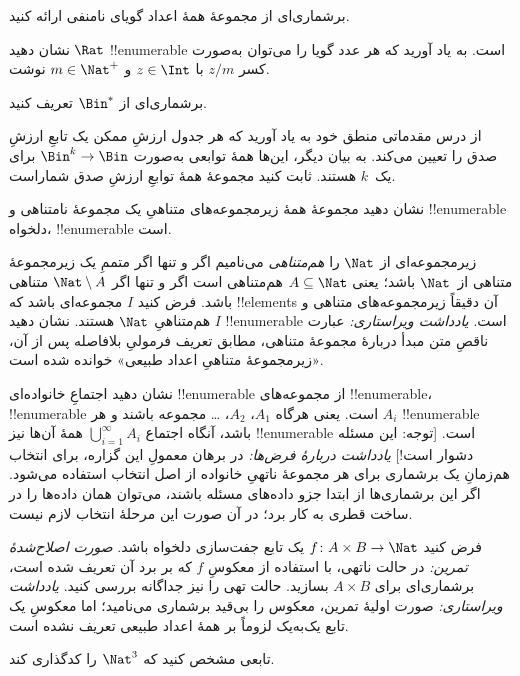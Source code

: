 \documentclass[../../../include/open-logic-section]{subfiles}
\begin{document}
\begin{prob}
برشماری‌ای از مجموعهٔ همهٔ اعداد گویای نامنفی ارائه کنید.
\end{prob}

\begin{prob}
نشان دهید $\Rat$ !!{enumerable} است. به یاد آورید که هر عدد گویا را
می‌توان به‌صورت کسر $z/m$ با $z \in \Int$ و $m \in \Nat^+$ نوشت.
\end{prob}

\begin{prob}
برشماری‌ای از $\Bin^*$ تعریف کنید.
\end{prob}

\begin{prob}
از درس مقدماتی منطق خود به یاد آورید که هر جدول ارزشِ ممکن یک تابعِ ارزشِ صدق
را تعیین می‌کند. به بیان دیگر، این‌ها همهٔ توابعی به‌صورت
$\Bin^k \to \Bin$ برای یک~$k$ هستند. ثابت کنید مجموعهٔ همهٔ توابعِ ارزشِ صدق
شماراست.
\end{prob}

\begin{prob}
نشان دهید مجموعهٔ همهٔ زیرمجموعه‌های متناهیِ یک مجموعهٔ نامتناهی و
!!{enumerable} دلخواه، !!{enumerable} است.
\end{prob}

\begin{prob}
زیرمجموعه‌ای از $\Nat$ را \emph{هم‌متناهی} می‌نامیم اگر و تنها اگر
متممِ یک زیرمجموعهٔ متناهی از~$\Nat$ باشد؛ یعنی $A \subseteq \Nat$
هم‌متناهی است اگر و تنها اگر $\Nat\setminus A$ متناهی باشد. فرض کنید
$I$ مجموعه‌ای باشد که !!{element}s آن دقیقاً زیرمجموعه‌های متناهی و
هم‌متناهیِ $\Nat$ هستند. نشان دهید $I$ !!{enumerable} است.
\emph{یادداشت ویراستاری:} عبارت ناقصِ متن مبدأ دربارهٔ مجموعهٔ متناهی، مطابق
تعریف فرمولیِ بلافاصله پس از آن، «زیرمجموعهٔ متناهیِ اعداد طبیعی» خوانده شده است.
\end{prob}

\begin{prob}
نشان دهید اجتماعِ خانواده‌ای !!{enumerable} از مجموعه‌های !!{enumerable}،
!!{enumerable} است. یعنی هرگاه $A_1$، $A_2$، \dots{} مجموعه باشند و هر
$A_i$ !!{enumerable} باشد، آنگاه اجتماع $\bigcup_{i=1}^\infty
A_i$ همهٔ آن‌ها نیز !!{enumerable} است. [توجه: این مسئله دشوار است!]
\emph{یادداشت دربارهٔ فرض‌ها:} در برهان معمولِ این گزاره، برای انتخاب هم‌زمانِ
یک برشماری برای هر مجموعهٔ ناتهیِ خانواده از اصل انتخاب استفاده می‌شود.
اگر این برشماری‌ها از ابتدا جزو داده‌های مسئله باشند، می‌توان همان داده‌ها را
در ساخت قطری به کار برد؛ در آن صورت این مرحلهٔ انتخاب لازم نیست.
\end{prob}

\begin{prob}
فرض کنید $f \colon A \times B \to \Nat$ یک تابع جفت‌سازی دلخواه باشد.
\emph{صورت اصلاح‌شدهٔ تمرین:} در حالت ناتهی، با استفاده از معکوسِ $f$
که بر برد آن تعریف شده است، برشماری‌ای برای $A \times B$ بسازید.
حالت تهی را نیز جداگانه بررسی کنید.
\emph{یادداشت ویراستاری:} صورت اولیهٔ تمرین، معکوس را بی‌قید برشماری می‌نامید؛
اما معکوسِ یک تابع یک‌به‌یک لزوماً بر همهٔ اعداد طبیعی تعریف نشده است.
\end{prob}

\begin{prob}
تابعی مشخص کنید که $\Nat^3$ را کدگذاری کند.
\end{prob}
\end{document}
